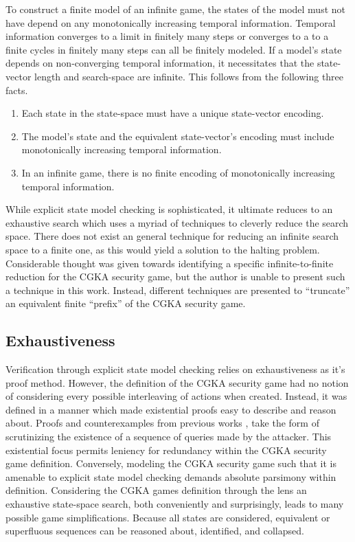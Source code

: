 To construct a finite model of an infinite game, the states of the model must not have depend on any monotonically increasing temporal information.
Temporal information converges to a limit in finitely many steps or converges to a to a finite cycles in finitely many steps can all be finitely modeled.
If a model's state depends on non-converging temporal information, it necessitates that the state-vector length and search-space are infinite.
This follows from the following three facts.

\begin{enumerate}
\def\labelenumi{\arabic{enumi}.}
\item
  Each state in the state-space must have a unique state-vector encoding.
\item
  The model's state and the equivalent state-vector's encoding must include monotonically increasing temporal information.
\item
  In an infinite game, there is no finite encoding of monotonically increasing temporal information.
\end{enumerate}

While explicit state model checking is sophisticated, it ultimate reduces to an exhaustive search which uses a myriad of techniques to cleverly reduce the search space.
There does not exist an general technique for reducing an infinite search space to a finite one, as this would yield a solution to the halting problem.
Considerable thought was given towards identifying a specific infinite-to-finite reduction for the CGKA security game, but the author is unable to present such a technique in this work.
Instead, different techniques are presented to ``truncate'' an equivalent finite ``prefix'' of the CGKA security game.

\hypertarget{exhaustiveness}{%
\subsection{Exhaustiveness}\label{exhaustiveness}}

Verification through explicit state model checking relies on exhaustiveness as it's proof method.
However, the definition of the CGKA security game had no notion of considering every possible interleaving of actions when created.
Instead, it was defined in a manner which made existential proofs easy to describe and reason about.
Proofs and counterexamples from previous works \autocite{alwen2019double}, \autocite{alwen2020security} take the form of scrutinizing the existence of a sequence of queries made by the attacker.
This existential focus permits leniency for redundancy within the CGKA security game definition.
Conversely, modeling the CGKA security game such that it is amenable to explicit state model checking demands absolute parsimony within definition.
Considering the CGKA games definition through the lens an exhaustive state-space search, both conveniently and surprisingly, leads to many possible game simplifications.
Because all states are considered, equivalent or superfluous sequences can be reasoned about, identified, and collapsed.


